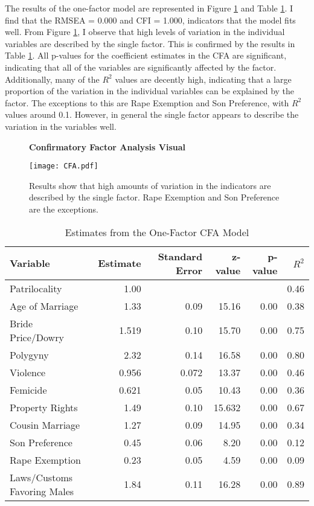 \documentclass[letterpaper,11pt]{article}
\begin{document}
The results of the one-factor model are represented in Figure \ref{cfavis} and Table \ref{res}. I find that the RMSEA = 0.000 and CFI = 1.000, indicators that the model fits well. From Figure \ref{cfavis}, I observe that high levels of variation in the individual variables are described by the single factor. This is confirmed by the results in Table \ref{res}. All p-values for the coefficient estimates in the CFA are significant, indicating that all of the variables are significantly affected by the factor. Additionally, many of the $R^2$ values are decently high, indicating that a large proportion of the variation in the individual variables can be explained by the factor. The exceptions to this are Rape Exemption and Son Preference, with $R^2$ values around 0.1. However, in general the single factor appears to describe the variation in the variables well.

\begin{figure}
\centering
  \textbf{Confirmatory Factor Analysis Visual}\par\medskip
  \texttt{[image: CFA.pdf]}
  \caption{Results show that high amounts of variation in the indicators are described by the single factor. Rape Exemption and Son Preference are the exceptions.}
  \label{cfavis}
\end{figure}

\begin{table}[htb]
    \centering
    \caption{Estimates from the One-Factor CFA Model}
    \footnotesize
    \begin{tabular}{l|r|r|r|r|r}
     Variable & Estimate & Standard Error & z-value & p-value & $R^2$ \\
     \hline
     Patrilocality & 1.00 & & & & 0.46 \\
     Age of Marriage & 1.33 & 0.09 & 15.16 & 0.00 & 0.38 \\
     Bride Price/Dowry & 1.519 & 0.10 & 15.70 & 0.00 & 0.75 \\
     Polygyny & 2.32 & 0.14 & 16.58 & 0.00 & 0.80 \\
     Violence & 0.956 & 0.072 & 13.37 & 0.00 & 0.46 \\
     Femicide & 0.621 & 0.05 & 10.43 & 0.00 & 0.36 \\
     Property Rights & 1.49 & 0.10 & 15.632 & 0.00 & 0.67 \\
     Cousin Marriage & 1.27 & 0.09 & 14.95 & 0.00 & 0.34 \\
     Son Preference & 0.45 & 0.06 & 8.20 & 0.00 & 0.12 \\
     Rape Exemption & 0.23 & 0.05 & 4.59 & 0.00 & 0.09 \\
     Laws/Customs Favoring Males & 1.84 & 0.11 & 16.28 & 0.00 & 0.89 \\
    \end{tabular}
    \label{res}
\end{table}
\end{document}
